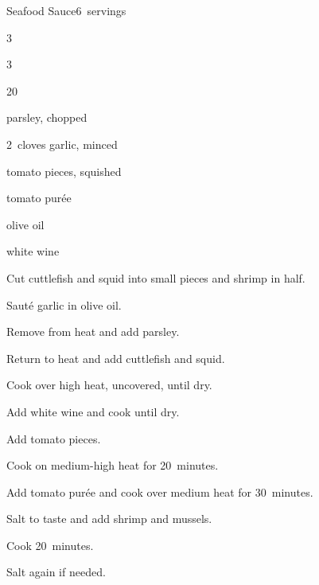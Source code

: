 \begin{recipe}{Seafood Sauce}{}{6~servings}

\begin{ingredients}
\item 3~
\item 3~
\item \lbs{\half} 
\item 20~
\item \C{\half} parsley, chopped
\item 2~cloves garlic, minced
\item {} tomato pieces, squished
\item {} tomato purée
\item \C{\half} olive oil
\item {} white wine
\end{ingredients}

\begin{directions}
\item Cut cuttlefish and squid into small pieces and shrimp in half.
\item Sauté garlic in olive oil.
\item Remove from heat and add parsley.
\item Return to heat and add cuttlefish and squid.
\item Cook over high heat, uncovered, until dry.
\item Add white wine and cook until dry.
\item Add tomato pieces.
\item Cook on medium-high heat for 20~minutes.
\item Add tomato purée and cook over medium heat for 30~minutes.
\item Salt to taste and add shrimp and mussels.
\item Cook 20~minutes.
\item Salt again if needed.
\end{directions}

\end{recipe}
